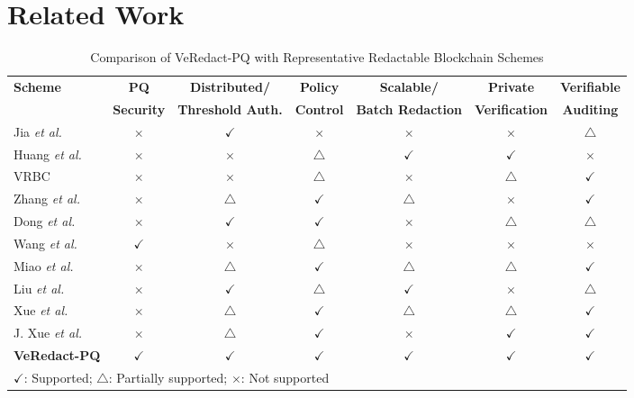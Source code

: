 \documentclass[lettersize,journal]{IEEEtran}
\begin{document}
\section{Related Work}
\begin{table}[t]
\centering
\caption{Comparison of VeRedact-PQ with Representative Redactable
Blockchain Schemes}
\label{tab:comparison}
\renewcommand{\arraystretch}{1.15}
\setlength{\tabcolsep}{4.2pt}
\begin{tabular}{lcccccc}
\hline
\textbf{Scheme} &
\textbf{PQ} &
\textbf{Distributed/} &
\textbf{Policy} &
\textbf{Scalable/} &
\textbf{Private} &
\textbf{Verifiable} \\
&
\textbf{Security} &
\textbf{Threshold Auth.} &
\textbf{Control} &
\textbf{Batch Redaction} &
\textbf{Verification} &
\textbf{Auditing} \\
\hline

Jia \emph{et al.}~\cite{ref1}
& $\times$ & $\checkmark$ & $\times$ & $\times$
& $\times$ & $\triangle$ \\

Huang \emph{et al.}~\cite{ref14}
& $\times$ & $\times$ & $\triangle$ & $\checkmark$
& $\checkmark$ & $\times$ \\

VRBC~\cite{ref13}
& $\times$ & $\times$ & $\triangle$ & $\times$
& $\triangle$ & $\checkmark$ \\

Zhang \emph{et al.}~\cite{ref5}
& $\times$ & $\triangle$ & $\checkmark$ & $\triangle$
& $\times$ & $\checkmark$ \\

Dong \emph{et al.}~\cite{ref15}
& $\times$ & $\checkmark$ & $\checkmark$ & $\times$
& $\triangle$ & $\triangle$ \\

Wang \emph{et al.}~\cite{ref17}
& $\checkmark$ & $\times$ & $\triangle$ & $\times$
& $\times$ & $\times$ \\

Miao \emph{et al.}~\cite{ref20}
& $\times$ & $\triangle$ & $\checkmark$ & $\triangle$
& $\triangle$ & $\checkmark$ \\

Liu \emph{et al.}~\cite{ref27}
& $\times$ & $\checkmark$ & $\triangle$ & $\checkmark$
& $\times$ & $\triangle$ \\

Xue \emph{et al.}~\cite{ref33}
& $\times$ & $\triangle$ & $\checkmark$ & $\triangle$
& $\triangle$ & $\checkmark$ \\

J. Xue \emph{et al.}~\cite{ref34}
& $\times$ & $\triangle$ & $\checkmark$ & $\times$
& $\checkmark$ & $\checkmark$ \\

\hline
\textbf{VeRedact-PQ}
& $\checkmark$ & $\checkmark$ & $\checkmark$
& $\checkmark$ & $\checkmark$ & $\checkmark$ \\
\hline

\multicolumn{7}{l}{
\footnotesize $\checkmark$: Supported;
$\triangle$: Partially supported;
$\times$: Not supported}
\end{tabular}
\end{table}
\end{document}
